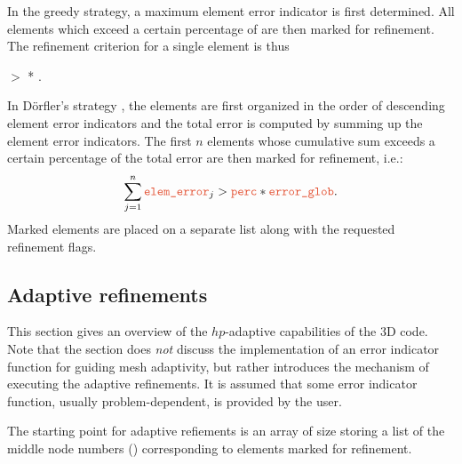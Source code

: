 In the greedy strategy, a maximum element error indicator  is first determined. All elements which exceed a certain percentage of  are then marked for refinement. The refinement criterion for a single element is thus
\begin{center}
	 $>$  .
\end{center}

In D\"orfler's strategy \cite{dorfler1996marking}, the elements are first organized in the order of descending element error indicators and the total error  is computed by summing up the element error indicators. The first $n$ elements whose cumulative sum exceeds a certain percentage of the total error are then marked for refinement, i.e.:
\[
	\sum_{j=1}^n \var{elem\_error}_j > \var{perc} * \var{error\_glob} .
\]
Marked elements are placed on a separate list along with the requested refinement flags.

\subsection{Adaptive refinements}
\label{sec:adaptive-refinements}

This section gives an overview of the $hp$-adaptive capabilities of the \hp3D code. Note that the section does \emph{not} discuss the implementation of an error indicator function for guiding mesh adaptivity, but rather introduces the mechanism of executing the adaptive refinements. It is assumed that some error indicator function, usually problem-dependent, is provided by the user. 

The starting point for adaptive refiements is an array  of size  storing a list of the middle node numbers () corresponding to elements marked for refinement.


